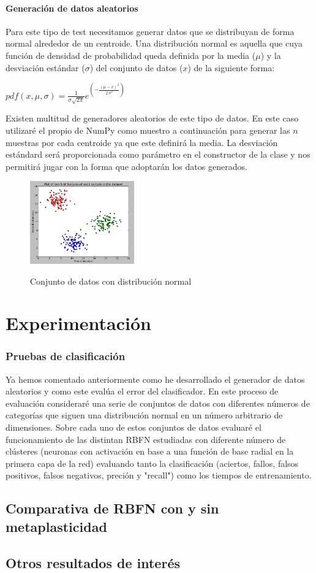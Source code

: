 \documentclass[10pt,a4paper]{report}
\begin{document}
\subsubsection{Generación de datos aleatorios}
Para este tipo de test necesitamos generar datos que se distribuyan de forma normal alrededor de un centroide. Una distribución normal es aquella que cuya función de densidad de probabilidad queda definida por la media ($\mu$) y la desviación estándar ($\sigma$) del conjunto de datos ($x$) de la siguiente forma:
\begin{center}
$pdf(x,\mu,\sigma) = \frac{1}{ \sigma \sqrt{2 \pi}} e^{\left(-\frac{{\left(\mu - x\right)}^{2}}{2 \, \sigma^{2}}\right)}$
\end{center} 
Existen multitud de generadores aleatorios de este tipo de datos. En este caso utilizaré el propio de NumPy como muestro a continuación para generar las $n$ muestras por cada centroide ya que este definirá la media. La desviación estándard será proporcionada como parámetro en el constructor de la clase y nos permitirá jugar con la forma que adoptarán los datos generados.

\begin{figure}[!h]{}
    \centering
    \includegraphics[width=0.4\textwidth]{img/clusteredData1.png}
    \label{fig:clusteredData1}
    \caption{Conjunto de datos con distribución normal}
\end{figure}

\chapter{Experimentación}
\subsection{Pruebas de clasificación}
Ya hemos comentado anteriormente como he desarrollado el generador de datos aleatorios y como este evalúa el error del clasificador. En este proceso de evaluación consideraré una serie de conjuntos de datos con diferentes números de categorías que siguen una distribución normal en un número arbitrario de dimensiones. Sobre cada uno de estos conjuntos de datos evaluaré el funcionamiento de las distintan RBFN estudiadas con diferente número de clústeres (neuronas con activación en base a una función de base radial en la primera capa de la red) evaluando tanto la clasificación (aciertos, fallos, falsos positivos, falsos negativos, preción y "recall") como los tiempos de entrenamiento.

\section{Comparativa de RBFN con y sin metaplasticidad}
\section{Otros resultados de interés}



\end{document}

